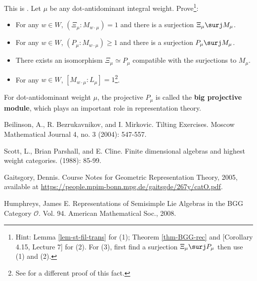 	\begin{exe}
		This is . Let $\mu$ be any dot-antidominant integral weight. Prove\footnote{Hint: Lemma \ref{lem-st-fil-trans} for (1); Theorem \ref{thm-BGG-rec} and [Corollary 4.15, Lecture 7] for (2). For (3), first find a surjection $\Xi_\mu \surj P_\mu$ then use (1) and (2).}:
		\begin{itemize}
			\item[(1)]
				For any $w\in W$, $(\Xi_\mu: M_{w\cdot\mu})=1$ and there is a surjection $\Xi_\mu \surj M_\mu$.
			\item[(2)]
				For any $w\in W$, $(P_\mu: M_{w\cdot\mu})\ge 1$ and there is a surjection $P_\mu \surj M_\mu$.
			\item[(3)]
				There exists an isomorphism $\Xi_\mu \simeq P_\mu$ compatible with the surjections to $M_\mu$.
			\item[(4)]
				For any $w\in W$, $[M_{w\cdot \mu}: L_\mu]=1$\footnote{See \cite[Proposition 4.20]{G} for a different proof of this fact.}.
		\end{itemize}

	\end{exe}

	\begin{rem}
		For dot-antidominant weight $\mu$, the projective $P_\mu$ is called the \textbf{big projective module}, which plays an important role in representation theory.
	\end{rem}
		




\begin{thebibliography}{Yau}

	 Beilinson, A., R. Bezrukavnikov, and I. Mirkovic. Tilting Exercises. Moscow Mathematical Journal 4, no. 3 (2004): 547-557.

	 Scott, L., Brian Parshall, and E. Cline. Finite dimensional algebras and highest weight categories. (1988): 85-99.

	 Gaitsgory, Dennis. Course Notes for Geometric Representation Theory, 2005, available at \url{https://people.mpim-bonn.mpg.de/gaitsgde/267y/catO.pdf}.



	 Humphreys, James E. Representations of Semisimple Lie Algebras in the BGG Category $\mathcal{O} $. Vol. 94. American Mathematical Soc., 2008.
\end{thebibliography}


 


